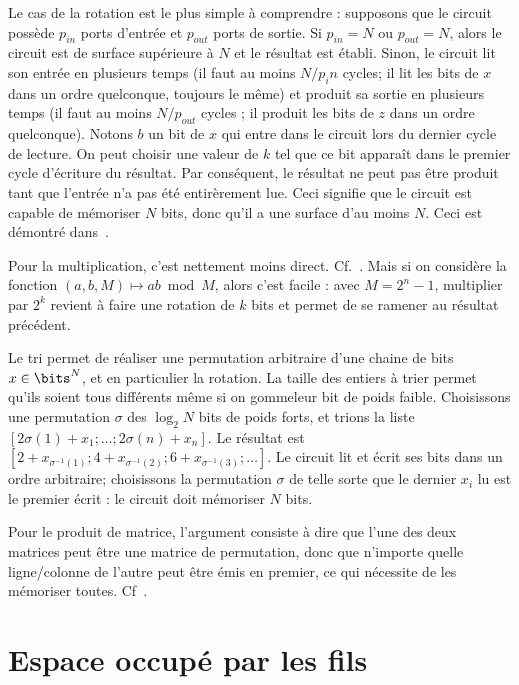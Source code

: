 \begin{danger}
  Le cas de la rotation est le plus simple à comprendre : supposons que le
  circuit possède $p_{in}$ ports d'entrée et $p_{out}$ ports de sortie. Si
  $p_{in} = N$ ou $p_{out} = N$, alors le circuit est de surface supérieure à
  $N$ et le résultat est établi. Sinon, le circuit lit son entrée en plusieurs
  temps (il faut au moins $N / p_in$ cycles; il lit les bits de $x$ dans un
  ordre quelconque, toujours le même) et produit sa sortie en plusieurs temps
  (il faut au moins $N / p_{out}$ cycles ; il produit les bits de $z$ dans un
  ordre quelconque). Notons $b$ un bit de $x$ qui entre dans le circuit lors du
  dernier cycle de lecture. On peut choisir une valeur de $k$ tel que ce bit
  apparaît dans le premier cycle d'écriture du résultat. Par conséquent, le
  résultat ne peut pas être produit tant que l'entrée n'a pas été entirèrement
  lue. Ceci signifie que le circuit est capable de mémoriser $N$ bits, donc
  qu'il a une surface d'au moins $N$. Ceci est démontré dans~\cite{Vuillemin83}.

  Pour la multiplication, c'est nettement moins
  direct. Cf.~\cite{BrentK80}. Mais si on considère la fonction
  $(a, b, M) \mapsto ab \bmod M$, alors c'est facile : avec $M = 2^n - 1$,
  multiplier par $2^k$ revient à faire une rotation de $k$ bits et permet de se
  ramener au résultat précédent.

  Le tri permet de réaliser une permutation arbitraire d'une chaine de bits
  $x \in \bits^N$, et en particulier la rotation. La taille des entiers à trier
  permet qu'ils soient tous différents même si on \og gomme\fg leur bit de poids
  faible. Choisissons une permutation $\sigma$ des $\log_2 N$ bits de poids
  forts, et trions la liste $[2 \sigma(1) + x_1; \dots; 2 \sigma(n) + x_n]$. Le
  résultat est
  $[ 2 + x_{\sigma^ {-1}(1)}; 4 + x_{\sigma^ {-1}(2)} ; 6 + x_{\sigma^ {-1}(3)};
  \dots ]$. Le circuit lit et écrit ses bits dans un ordre arbitraire;
  choisissons la permutation $\sigma$ de telle sorte que le dernier $x_i$ lu est
  le premier écrit : le circuit doit mémoriser $N$ bits.

  Pour le produit de matrice, l'argument consiste à dire que l'une des deux
  matrices peut être une matrice de permutation, donc que n'importe quelle
  ligne/colonne de l'autre peut être émis en premier, ce qui nécessite de les
  mémoriser toutes. Cf~\cite{ChazelleM81}.
\end{danger}


\section{Espace occupé par les fils}


